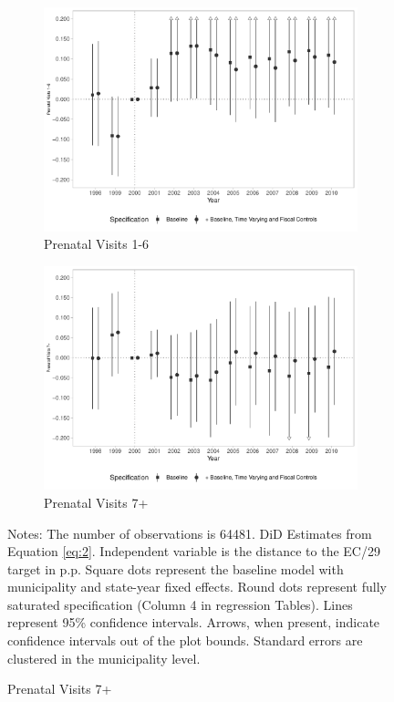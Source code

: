 \begin{figure}[h!]
\begin{center}
    \begin{subfigure}{0.48\textwidth}
        \centering
        \caption{\scriptsize Prenatal Visits 1-6}\label{fig:13c}
        \includegraphics[width=\textwidth]{plots/birth_prenat_1_6_dist_ec29_baseline_dist_ec29_baseline_13.pdf}
    \end{subfigure}
    \begin{subfigure}{0.48\textwidth}
        \centering
        \caption{\scriptsize Prenatal Visits 7+}\label{fig:13d}
        \includegraphics[width=\textwidth]{plots/birth_prenat_7_plus_dist_ec29_baseline_dist_ec29_baseline_13.pdf}
    \end{subfigure}
        
    
    \end{center}
    
    \scriptsize{Notes: The number of observations is 64481. DiD Estimates from Equation \ref{eq:2}. Independent variable is the distance to the EC/29 target in p.p. Square dots represent the baseline model with municipality and state-year fixed effects. Round dots represent fully saturated specification (Column 4 in regression Tables). Lines represent 95\% confidence intervals. Arrows, when present, indicate confidence intervals out of the plot bounds. Standard errors are clustered in the municipality level.}

    
\end{figure}